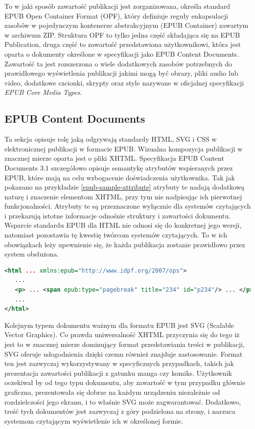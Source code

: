 To w jaki sposób zawartość publikacji jest zorganizowana, określa standard EPUB Open Container Format (OPF), który definiuje reguły enkapsulacji zasobów w pojedynczym kontenerze abstrakcyjnym (EPUB Container) zawartym w archiwum ZIP. Struktura OPF to tylko jedna część składająca się na EPUB Publication, druga część to zawartość przedstawiona użytkownikowi, która jest oparta o dokumenty określone w specyfikacji jako EPUB Content Documents. Zawartość ta jest rozszerzona o wiele dodatkowych zasobów potrzebnych do prawidłowego wyświetlenia publikacji jakimi mogą być obrazy, pliki audio lub video, dodatkowe czcionki, skrypty oraz style nazywane w oficjalnej specyfikacji \textit{EPUB Core Media Types}.

\subsection{EPUB Content Documents}

Ta sekcja opisuje rolę jaką odgrywają standardy HTML, SVG i CSS w elektronicznej publikacji w formacie EPUB. Wizualna kompozycja publikacji w znacznej mierze oparta jest o pliki XHTML. Specyfikacja EPUB Content Documents 3.1 szczegółowo opisuje semantykę atrybutów wspieranych przez EPUB, które mają na celu wzbogacenie doświadczenia użytkownika. Tak jak pokazano na przykładzie \ref{epub-sample-attribute} atrybuty te nadają dodatkową naturę i znaczenie elementom XHTML, przy tym nie nadpisując ich pierwotnej funkcjonalności. Atrybuty te są przeznaczone wyłącznie dla systemów czytających i przekazują istotne informacje odnośnie struktury i zawartości dokumentu. Wsparcie standardu EPUB dla HTML nie odnosi się do konkretnej jego wersji, natomiast pozostawia tę kwestię twórcom systemów czytających. To w ich obowiązkach leży upewnienie się, że każda publikacja zostanie prawidłowo przez system obsłużona.

\begin{lstlisting}[float=h, caption={Przykładowe wykorzystanie atrybutu epub:type aby oznaczyć zakończenie linii.\protect\cite{EPUBContentDocumentsSpecification}}, language=XML, label=epub-sample-attribute]
<html ... xmlns:epub="http://www.idpf.org/2007/ops">
   ...
   <p> ... <span epub:type="pagebreak" title="234" id="p234"/> ... </p>
   ...
</html>
\end{lstlisting}

Kolejnym typem dokumentu ważnym dla formatu EPUB jest SVG (Scalable Vector Graphics). Co prawda uniwersalność XHTML przyczynia się do tego iż jest to w znacznej mierze dominujący format przedstawiania treści w publikacji, SVG oferuje udogodnienia dzięki czemu również znajduje zastosowanie. Format ten jest zazwyczaj wykorzystywany w specyficznych przypadkach, takich jak prezentacja zawartości publikacji z gatunku manga czy komiks. Użytkownik oczekiwał by od tego typu dokumentu, aby zawartość w tym przypadku głównie graficzna, prezentowała się dobrze na każdym urządzeniu niezależnie od rozdzielczości jego ekranu, i to właśnie SVG może zagwarantować. Dodatkowo, treść tych dokumentów jest zazwyczaj z góry podzielona na strony, i narzuca systemom czytającym wyświetlenie ich w określonej formie.

